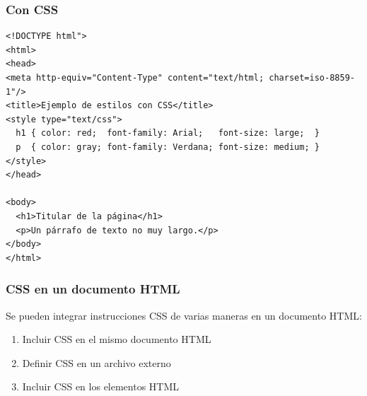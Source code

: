 
\begin{frame}[fragile]
\frametitle{Con CSS}

{\footnotesize
\begin{verbatim}
<!DOCTYPE html">
<html>
<head>
<meta http-equiv="Content-Type" content="text/html; charset=iso-8859-1"/>
<title>Ejemplo de estilos con CSS</title>
<style type="text/css">
  h1 { color: red;  font-family: Arial;   font-size: large;  }
  p  { color: gray; font-family: Verdana; font-size: medium; }
</style>
</head>
 
<body>
  <h1>Titular de la página</h1>
  <p>Un párrafo de texto no muy largo.</p>
</body>
</html>
\end{verbatim}
}

\end{frame}


\begin{frame}
\frametitle{CSS en un documento HTML}

Se pueden integrar instrucciones CSS de varias maneras en un documento
HTML:

\begin{enumerate}
  \item Incluir CSS en el mismo documento HTML
  \item Definir CSS en un archivo externo
  \item Incluir CSS en los elementos HTML
\end{enumerate}

\end{frame}


